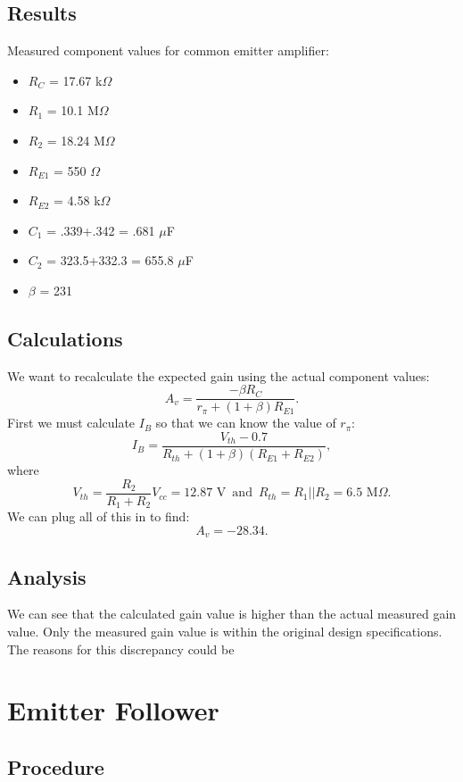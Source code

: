 \documentclass[12pt,letterpaper]{report}
\begin{document}
\subsection*{Results}

Measured component values for common emitter amplifier:
\begin{itemize}
\item $R_C$ = 17.67 k$\Omega$
\item $R_1$ = 10.1 M$\Omega$
\item $R_2$ = 18.24 M$\Omega$
\item $R_{E1}$ = 550 $\Omega$
\item $R_{E2}$ = 4.58 k$\Omega$
\item $C_1$ = .339+.342 = .681 $\mu$F
\item $C_2$ = 323.5+332.3 = 655.8 $\mu$F
\item $\beta$ = 231
\end{itemize}



\subsection*{Calculations}

We want to recalculate the expected gain using the actual component values:
$$
A_v = \frac{-\beta R_C}{r_{\pi}+(1+\beta)R_{E1}}.
$$
First we must calculate $I_B$ so that we can know the value of $r_{\pi}$:
$$
I_B = \frac{V_{th}-0.7}{R_{th}+(1+\beta)(R_{E1}+R_{E2})},
$$
where
$$
V_{th} = \frac{R_2}{R_1+R_2}V_{cc} = 12.87 \text{ V}\, \text{ and } \, 
R_{th} = R_1||R_2 = 6.5 \text{ M}\Omega.
$$
We can plug all of this in to find:
$$
A_v = -28.34.
$$

\subsection*{Analysis}

We can see that the calculated gain value is higher than the actual measured gain value. Only the measured gain value is within the original design specifications. The reasons for this discrepancy could be 

\section*{Emitter Follower}
\subsection*{Procedure}
\end{document}
